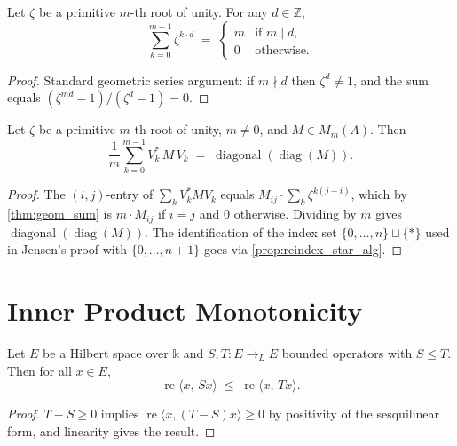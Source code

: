\begin{theorem}
  \label{thm:geom_sum}
  \leanok
  Let $\zeta$ be a primitive $m$-th root of unity.  For any $d \in \mathbb{Z}$,
  \[
    \sum_{k=0}^{m-1} \zeta^{k\cdot d}
    \;=\;
    \begin{cases} m & \text{if } m \mid d, \\ 0 & \text{otherwise.} \end{cases}
  \]
  \begin{proof}
    \leanok
    Standard geometric series argument: if $m \nmid d$ then $\zeta^d \neq 1$, and the
    sum equals $(\zeta^{md} - 1)/(\zeta^d - 1) = 0$.
  \end{proof}
\end{theorem}

\begin{theorem}
  \label{thm:fourier_avg}
  \leanok
  Let $\zeta$ be a primitive $m$-th root of unity, $m \neq 0$, and
  $M \in M_m(A)$.  Then
  \[
    \frac{1}{m} \sum_{k=0}^{m-1} V_k^*\, M\, V_k
    \;=\;
    \operatorname{diagonal}(\operatorname{diag}(M)).
  \]
  \begin{proof}
    \leanok
    The $(i,j)$-entry of $\sum_k V_k^* M V_k$ equals
    $M_{ij} \cdot \sum_k \zeta^{k(j-i)}$, which by \ref{thm:geom_sum} is
    $m \cdot M_{ij}$ if $i = j$ and $0$ otherwise.
    Dividing by $m$ gives $\operatorname{diagonal}(\operatorname{diag}(M))$.
    The identification of the index set $\{0,\ldots,n\} \sqcup \{*\}$ used in Jensen's proof
    with $\{0,\ldots,n+1\}$ goes via \ref{prop:reindex_star_alg}.
  \end{proof}
\end{theorem}

\section{Inner Product Monotonicity}

\begin{lemma}
  \label{lem:reapply_inner_mono}
  \leanok
  Let $E$ be a Hilbert space over $\mathbb{k}$ and $S, T : E \to_L E$ bounded operators
  with $S \leq T$.  Then for all $x \in E$,
  \[
    \operatorname{re}\langle x,\, S x\rangle \;\leq\; \operatorname{re}\langle x,\, T x\rangle.
  \]
  \begin{proof}
    \leanok
    $T - S \geq 0$ implies $\operatorname{re}\langle x, (T-S)x\rangle \geq 0$ by
    positivity of the sesquilinear form, and linearity gives the result.
  \end{proof}
\end{lemma}
